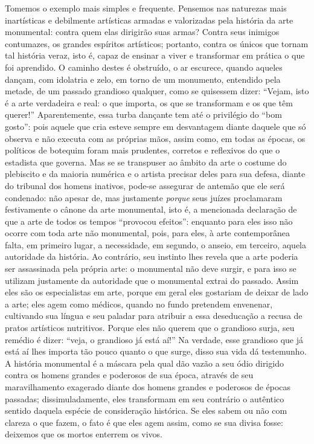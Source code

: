 Tomemos o exemplo mais simples e frequente. Pensemos nas naturezas mais
inartísticas e debilmente artísticas armadas e valorizadas pela história
da arte monumental: contra quem elas dirigirão suas armas? Contra seus
inimigos contumazes, os grandes espíritos artísticos; portanto, contra
os únicos que tornam tal história veraz, isto é, capaz de ensinar a
viver e transformar em prática o que foi aprendido. O caminho destes é
obstruído, o ar escurece, quando aqueles dançam, com idolatria e zelo,
em torno de um monumento, entendido pela metade, de um passado grandioso
qualquer, como se quisessem dizer: ``Vejam, isto é a arte verdadeira e
real: o que importa, os que se transformam e os que têm querer!''
Aparentemente, essa turba dançante tem até o privilégio do ``bom
gosto'': pois aquele que cria esteve sempre em desvantagem diante
daquele que só observa e não executa com as próprias mãos, assim como,
em todas as épocas, os políticos de botequim foram mais prudentes,
corretos e reflexivos do que o estadista que governa. Mas se se
transpuser ao âmbito da arte o costume do plebiscito e da maioria
numérica e o artista precisar deles para sua defesa, diante do tribunal
dos homens inativos, pode-se assegurar de antemão que ele será
condenado: não apesar de, mas justamente \emph{porque} seus juízes
proclamaram festivamente o cânone da arte monumental, isto é, a
mencionada declaração de que a arte de todos os tempos ``provocou
efeitos'': enquanto para eles isso não ocorre com toda arte
não monumental, pois, para eles, à arte contemporânea falta, em primeiro
lugar, a necessidade, em segundo, o anseio, em terceiro, aquela
autoridade da história. Ao contrário, seu instinto lhes revela que a
arte poderia ser assassinada pela própria arte: o monumental não deve
surgir, e para isso se utilizam justamente da autoridade que o
monumental extrai do passado. Assim eles são os especialistas em arte,
porque em geral eles gostariam de deixar de lado a arte; eles agem como
médicos, quando no fundo pretendem envenenar, cultivando sua língua e
seu paladar para atribuir a essa deseducação a recusa de pratos
artísticos nutritivos. Porque eles não querem que o grandioso surja, seu
remédio é dizer: ``veja, o grandioso já está aí!'' Na verdade, esse
grandioso que já está aí lhes importa tão pouco quanto o que surge,
disso sua vida dá testemunho. A história monumental é a máscara pela
qual dão vazão a seu ódio dirigido contra os homens grandes e poderosos
de sua época, através de seu maravilhamento exagerado diante dos homens
grandes e poderosos
 de épocas passadas; dissimuladamente, eles
transformam em seu contrário o autêntico sentido daquela espécie de
consideração histórica. Se eles sabem ou não com clareza o que fazem, o
fato é que eles agem assim, como se sua divisa fosse: deixemos que os
mortos enterrem os vivos.

